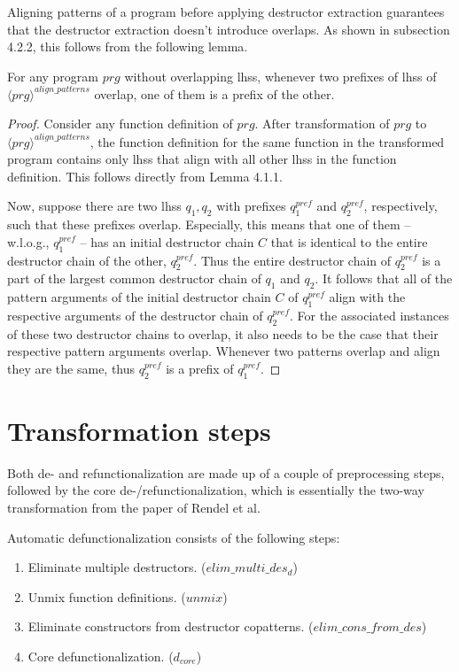 Aligning patterns of a program before applying destructor extraction guarantees that the destructor extraction doesn't introduce overlaps. As shown in subsection 4.2.2, this follows from the following lemma.

\begin{lemma}
For any program $prg$ without overlapping lhss, whenever two prefixes of lhss of $\langle prg \rangle^{align\_patterns}$ overlap, one of them is a prefix of the other.

\begin{proof}
Consider any function definition of $prg$. After transformation of $prg$ to $\langle prg \rangle^{align\_patterns}$, the function definition for the same function in the transformed program contains only lhss that align with all other lhss in the function definition. This follows directly from Lemma 4.1.1.

Now, suppose there are two lhss $q_1, q_2$ with prefixes $q^{\mathit{pref}}_1$ and $q^{\mathit{pref}}_2$, respectively, such that these prefixes overlap. Especially, this means that one of them -- w.l.o.g., $q^{\mathit{pref}}_1$ -- has an initial destructor chain $C$ that is identical to the entire destructor chain of the other, $q^{\mathit{pref}}_2$. Thus the entire destructor chain of $q^{\mathit{pref}}_2$ is a part of the largest common destructor chain of $q_1$ and $q_2$. It follows that all of the pattern arguments of the initial destructor chain $C$ of $q^{\mathit{pref}}_1$ align with the respective arguments of the destructor chain of $q^{\mathit{pref}}_2$. For the associated instances of these two destructor chains to overlap, it also needs to be the case that their respective pattern arguments overlap. Whenever two patterns overlap and align they are the same, thus $q^{\mathit{pref}}_2$ is a prefix of $q^{\mathit{pref}}_1$.
\end{proof}
\end{lemma}

\section{Transformation steps}

Both de- and refunctionalization are made up of a couple of preprocessing steps, followed by the core de-/refunctionalization, which is essentially the two-way transformation from the paper of Rendel et al.

Automatic defunctionalization consists of the following steps:
\begin{enumerate}
\item Eliminate multiple destructors. ($elim\_multi\_des_d$)

\item Unmix function definitions. ($unmix$)

\item Eliminate constructors from destructor copatterns. ($elim\_cons\_from\_des$)

\item Core defunctionalization. ($d_{core}$)

\end{enumerate}

